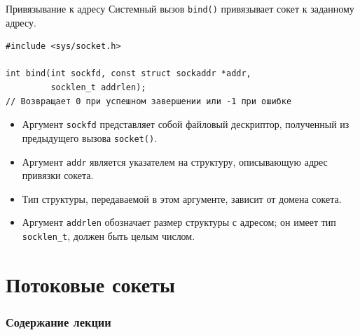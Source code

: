 \documentclass{beamer}
\begin{document}
\begin{frame}[fragile]{Привязывание к адресу}
    Системный вызов \texttt{bind()} привязывает сокет к заданному адресу.
\begin{verbatim}
#include <sys/socket.h>

int bind(int sockfd, const struct sockaddr *addr, 
         socklen_t addrlen);
// Возвращает 0 при успешном завершении или -1 при ошибке
\end{verbatim}

	\begin{itemize}
    	\item Аргумент \texttt{sockfd} представляет собой файловый дескриптор, полученный из предыдущего вызова \texttt{socket()}. 
    	\item Аргумент \texttt{addr} является указателем на структуру, описывающую адрес привязки сокета. 
    	\item Тип структуры, передаваемой в этом аргументе, зависит от домена сокета. 
    	\item Аргумент \texttt{addrlen} обозначает размер структуры с адресом; он имеет тип \texttt{socklen\_t}, должен быть целым числом.
	\end{itemize}    
\end{frame}

\section{Потоковые сокеты}

\begin{frame}
  \frametitle{Содержание лекции}
  \tableofcontents[current]
\end{frame}
\end{document}
